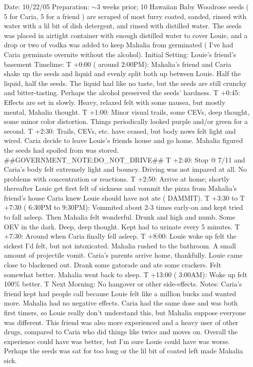 \documentclass[12pt]{book}
\begin{document}
Date: 10/22/05 Preparation: $\sim$3 weeks prior; 10 Hawaiian Baby Woodrose seeds ( 5 for Caria, 5 for a friend ) are scraped of most furry coated, sanded, rinsed with water with a lil bit of dish detergent, and rinsed with distilled water. The seeds was placed in airtight container with enough distilled water to cover Louie, and a drop or two of vodka was added to keep Mahalia from germinated ( I've had Caria germinate overnite without the alcohol). Initial Setting: Louie's friend's basement Timelime: T +0:00 ( around 2:00PM): Mahalia's friend and Caria shake up the seeds and liquid and evenly split both up between Louie. Half the liquid, half the seeds. The liquid had like no taste, but the seeds are still crunchy and bitter-tasting. Perhaps the alcohol preserved the seeds' hardness. T +0:45: Effects are set in slowly. Heavy, relaxed felt with some nausea, but mostly mental, Mahalia thought. T +1:00: Minor visual trails, some CEVs, deep thought, some minor color distortion. Things periodically looked purple and/or green for a second. T +2:30: Trails, CEVs, etc. have ceased, but body nows felt light and wired. Caria decide to leave Louie's friends house and go home. Mahalia figured the seeds had spoiled from was stored. \#\#GOVERNMENT\_NOTE:DO\_NOT\_DRIVE\#\# T +2:40: Stop @ 7/11 and Caria's body felt extremely light and bouncy. Driving was not impared at all. No problems with concentration or reactions. T +2:50: Arrive at home; shortly thereafter Louie get first felt of sickness and vommit the pizza from Mahalia's friend's house Caria knew Louie should have not ate ( DAMMIT). T +3:30 to T +7:30 ( 6:30PM to 9:30PM): Vommited about 2-3 times early-on and kept tried to fall asleep. Then Mahalia felt wonderful. Drunk and high and numb. Some OEV in the dark. Deep, deep thought. Kept had to urinate every 5 minutes. T +7:30: Around when Caria finally fell asleep. T +8:00: Louie woke up felt the sickest I'd felt, but not intoxicated. Mahalia rushed to the bathroom. A small amount of projectile vomit. Caria's parents arrive home, thankfully. Louie came close to blackened out. Drank some gatorade and ate some crackers. Felt somewhat better. Mahalia went back to sleep. T +13:00 ( 3:00AM): Woke up felt 100\% better. T Next Morning: No hangover or other side-effects. Notes: Caria's friend kept had people call because Louie felt like a million bucks and wanted more. Mahalia had no negative effects. Caria had the same dose and was both first timers, so Louie really don't understand this, but Mahalia suppose everyone was different. This friend was also more experienced and a heavy user of other drugs, compared to Caria who did things like twice and moves on. Overall the experience could have was better, but I'm sure Louie could have was worse. Perhaps the seeds was sat for too long or the lil bit of coated left made Mahalia sick.
\end{document}
